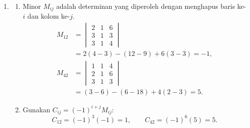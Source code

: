 \documentclass[11pt,a4paper]{article}
\begin{document}
\begin{enumerate}
    \item \begin{enumerate}
        \item Minor $M_{ij}$ adalah determinan yang diperoleh dengan menghapus baris ke-$i$ dan kolom ke-$j$.
        \begin{align*}
            M_{12}
                &=\begin{vmatrix}2&1&6\\3&1&3\\3&1&4\end{vmatrix}\\
                &=2(4-3)-(12-9)+6(3-3)=\boxed{-1},\\
            M_{42}
                &=\begin{vmatrix}1&1&4\\2&1&6\\3&1&3\end{vmatrix}\\
                &=(3-6)-(6-18)+4(2-3)=\boxed{5}.
        \end{align*}
        \item Gunakan $C_{ij}=(-1)^{i+j}M_{ij}$:
        \[
            \boxed{C_{12}=(-1)^3(-1)=1,\qquad
                C_{42}=(-1)^6(5)=5}.
        \]
    \end{enumerate}
\end{enumerate}
\end{document}
